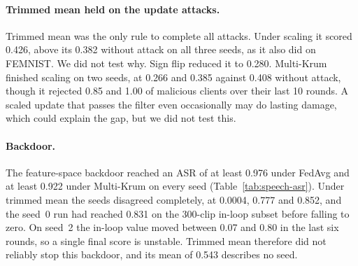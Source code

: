\paragraph{Trimmed mean held on the update attacks.}
Trimmed mean was the only rule to complete all attacks. Under scaling it scored 0.426, above its 0.382 without attack on all three seeds, as it also did on FEMNIST. We did not test why. Sign flip reduced it to 0.280. Multi-Krum finished scaling on two seeds, at 0.266 and 0.385 against 0.408 without attack, though it rejected 0.85 and 1.00 of malicious clients over their last 10 rounds. A scaled update that passes the filter even occasionally may do lasting damage, which could explain the gap, but we did not test this.

\paragraph{Backdoor.}
The feature-space backdoor reached an ASR of at least 0.976 under FedAvg and at least 0.922 under Multi-Krum on every seed (Table~\ref{tab:speech-asr}). Under trimmed mean the seeds disagreed completely, at 0.0004, 0.777 and 0.852, and the seed~0 run had reached 0.831 on the 300-clip in-loop subset before falling to zero. On seed~2 the in-loop value moved between 0.07 and 0.80 in the last six rounds, so a single final score is unstable. Trimmed mean therefore did not reliably stop this backdoor, and its mean of 0.543 describes no seed.

\begin{table}[H]
\centering
\caption{Speech Commands backdoor ASR on the full test split after 40 rounds, over three seeds.}
\label{tab:speech-asr}

\end{table}

